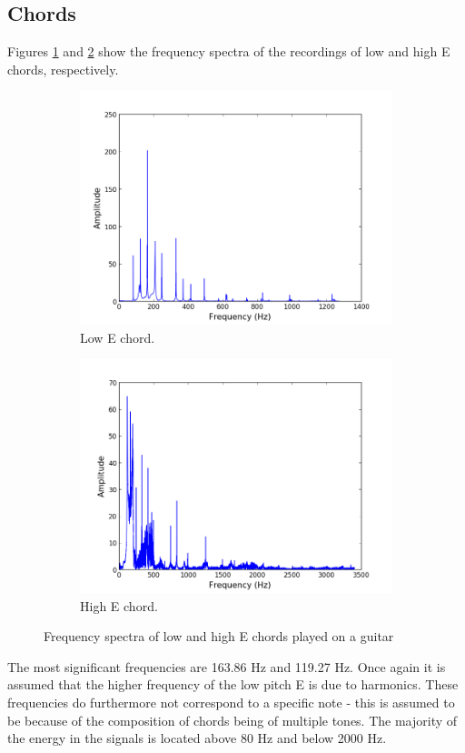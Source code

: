 \subsection{Chords}
Figures \ref{fig:chord_low} and \ref{fig:chord_high} show the frequency spectra of the recordings of low and high E chords, respectively.
\begin{figure}[H]
\centering
\begin{subfigure}{0.49\textwidth}
\centering
\includegraphics[width=\textwidth]{figures/freqanal/chord_low.png}
\caption{Low E chord.}
\label{fig:chord_low}
\end{subfigure}
\begin{subfigure}{0.49\textwidth}
\centering
\includegraphics[width = \textwidth]{figures/freqanal/chord_high.png}
\caption{High E chord.}
\label{fig:chord_high}
\end{subfigure}
\caption{Frequency spectra of low and high E chords played on a guitar}
\label{fig:chord}
\end{figure}
The most significant frequencies are 163.86 Hz and 119.27 Hz. Once again it is assumed that the higher frequency of the low pitch E is due to harmonics. These frequencies do furthermore not correspond to a specific note - this is assumed to be because of the composition of chords being of multiple tones. The majority of the energy in the signals is located above 80 Hz and below 2000 Hz.

